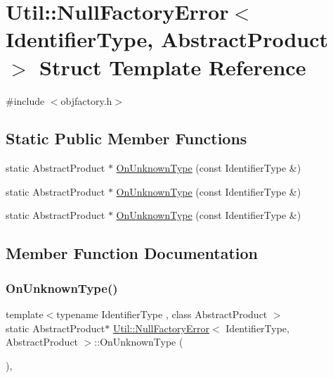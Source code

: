 \hypertarget{structUtil_1_1NullFactoryError}{}\section{Util\+:\+:Null\+Factory\+Error$<$ Identifier\+Type, Abstract\+Product $>$ Struct Template Reference}
\label{structUtil_1_1NullFactoryError}


{\ttfamily \#include $<$objfactory.\+h$>$}

\subsection*{Static Public Member Functions}
\begin{DoxyCompactItemize}
\item 
static Abstract\+Product $\ast$ \mbox{\hyperlink{structUtil_1_1NullFactoryError_a237b7bcb3c07a5337eec26c8d9f40e1b}{On\+Unknown\+Type}} (const Identifier\+Type \&)
\item 
static Abstract\+Product $\ast$ \mbox{\hyperlink{structUtil_1_1NullFactoryError_a237b7bcb3c07a5337eec26c8d9f40e1b}{On\+Unknown\+Type}} (const Identifier\+Type \&)
\item 
static Abstract\+Product $\ast$ \mbox{\hyperlink{structUtil_1_1NullFactoryError_a237b7bcb3c07a5337eec26c8d9f40e1b}{On\+Unknown\+Type}} (const Identifier\+Type \&)
\end{DoxyCompactItemize}


\subsection{Member Function Documentation}
\mbox{\label{structUtil_1_1NullFactoryError_a237b7bcb3c07a5337eec26c8d9f40e1b}} 
\subsubsection{\texorpdfstring{OnUnknownType()}{OnUnknownType()}\hspace{0.1cm}{\footnotesize\ttfamily [1/3]}}
{\footnotesize\ttfamily template$<$typename Identifier\+Type , class Abstract\+Product $>$ \\
static Abstract\+Product$\ast$ \mbox{\hyperlink{structUtil_1_1NullFactoryError}{Util\+::\+Null\+Factory\+Error}}$<$ Identifier\+Type, Abstract\+Product $>$\+::On\+Unknown\+Type (\begin{DoxyParamCaption}\item[{const Identifier\+Type \&}]{ }\end{DoxyParamCaption})\hspace{0.3cm}{\ttfamily [inline]}, {\ttfamily [static]}}


